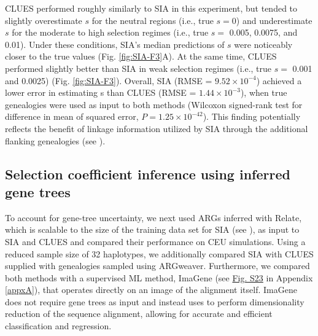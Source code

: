 CLUES performed roughly similarly to \ac{SIA} in this experiment, but tended to slightly overestimate $s$ for the neutral regions (i.e., true $s=0$) and underestimate $s$ for the moderate to high selection regimes (i.e., true $s=$ 0.005, 0.0075, and 0.01). Under these conditions, \ac{SIA}’s median predictions of $s$ were noticeably closer to the true values (Fig. \ref{fig:SIA-F3}A). At the same time, CLUES performed slightly better than \ac{SIA} in weak selection regimes (i.e., true $s=$ 0.001 and 0.0025) (Fig. \ref{fig:SIA-F3}). Overall, \ac{SIA} (\ac{RMSE} = $9.52\times 10^{-4}$) achieved a lower error in estimating s than CLUES (\ac{RMSE} = $1.44\times 10^{-3}$), when true genealogies were used as input to both methods (Wilcoxon signed-rank test for difference in mean of squared error, $P=1.25\times 10^{-42}$). This finding potentially reflects the benefit of linkage information utilized by \ac{SIA} through the additional flanking genealogies (see ).

\subsection{Selection coefficient inference using inferred gene trees}
To account for gene-tree uncertainty, we next used \acp{ARG} inferred with Relate, which is scalable to the size of the training data set for \ac{SIA} (see ), as input to \ac{SIA} and CLUES and compared their performance on CEU simulations. Using a reduced sample size of 32 haplotypes, we additionally compared \ac{SIA} with CLUES supplied with genealogies sampled using ARGweaver. Furthermore, we compared both methods with a supervised \ac{ML} method, ImaGene (see \href{https://academic.oup.com/mbe/article/39/1/msab332/6433161#supplementary-data}{Fig. S23} in Appendix \ref{appxA}), that operates directly on an image of the alignment itself. ImaGene does not require gene trees as input and instead uses  to perform dimensionality reduction of the sequence alignment, allowing for accurate and efficient classification and regression.

